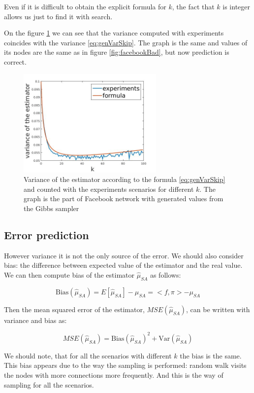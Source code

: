 \documentclass[12pt]{report}
\begin{document}
Even if it is difficult to obtain the explicit formula for $k$, the fact that $k$ is integer allows us just to find it with search.

On the figure \ref{fig:facebookGood} we can see that the variance computed with experiments coincides with the variance \ref{eq:genVarSkip}. The graph is the same and values of its nodes are the same as in figure \ref{fig:facebookBad}, but now prediction is correct.

\begin{figure}[ht]
    \centering
    \includegraphics[height=200px]{facebookGood}
    \caption{Variance of the estimator according to the formula \ref{eq:genVarSkip} and counted with the experiments scenarios for different $k$. The graph is the part of Facebook network \cite{Facebook} with generated values from the Gibbs sampler}
    \label{fig:facebookGood}
\end{figure}


\subsection{Error prediction}

However variance it is not the only source of the error. We should also consider bias: the difference between expected value of the estimator and the real value. We can then compute bias of the estimator $\hat{\mu}_{SA}$ as follows:

$$\mathrm{Bias}(\hat{\mu}_{SA}) = E[\hat{\mu}_{SA}] - \mu_{SA} = <f, \pi> - \mu_{SA}$$

Then the mean squared error of the estimator, $MSE(\hat{\mu}_{SA})$, can be written with variance and bias as: 

$$MSE(\hat{\mu}_{SA}) = \mathrm{Bias}(\hat{\mu}_{SA})^2 + \mathrm{Var}(\hat{\mu}_{SA})$$

We should note, that for all the scenarios with different $k$ the bias is the same. This bias appears due to the way the sampling is performed: random walk visits the nodes with more connections more frequently. And this is the way of sampling for all the scenarios.
\end{document}
